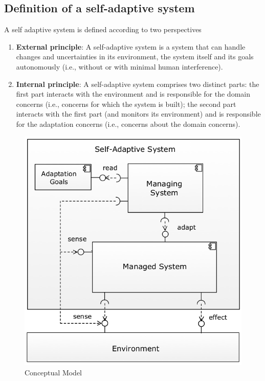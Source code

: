 \documentclass[pdftex,english,oribibl]{llncs}
\begin{document}
\subsection{Definition of a self-adaptive system}
A self adaptive system is defined according to two perspectives \cite{softwareEngineeringSA}
\begin{enumerate}
	\item \textbf{External principle}: A self-adaptive system is a system that can handle
	      changes and uncertainties in its environment, the system itself and its
	      goals autonomously (i.e., without or with minimal human interference).
	\item \textbf{Internal principle}: A self-adaptive system comprises two distinct parts:
	      the first part interacts with the environment and is responsible for the
	      domain concerns (i.e., concerns for which the system is built); the
	      second part interacts with the first part (and monitors its environment)
	      and is responsible for the adaptation concerns (i.e., concerns about the
	      domain concerns).
\end{enumerate}
\begin{figure}[H]
\centering
	\includegraphics[totalheight=6cm]{figures/conceptualModel}
    \caption{Conceptual Model \citep{softwareEngineeringSA}}
    \label{fig:conceptualModel}
\end{figure}
\end{document}

